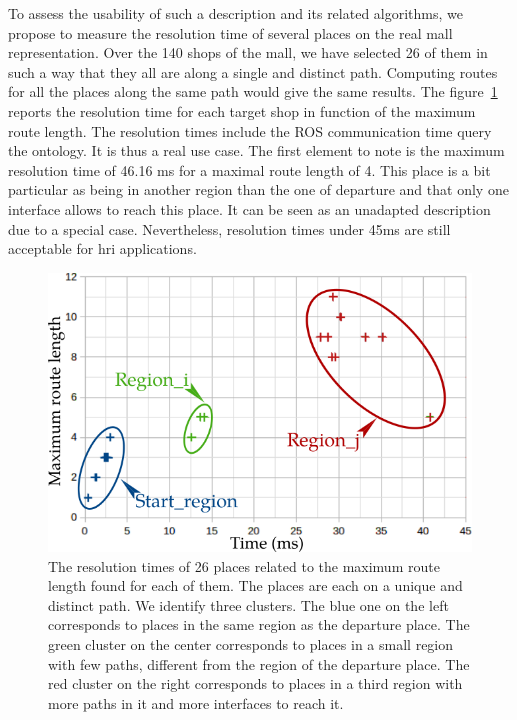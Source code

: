To assess the usability of such a description and its related algorithms, we propose to measure the resolution time of several places on the real mall representation. Over the 140 shops of the mall, we have selected 26 of them in such a way that they all are along a single and distinct path. Computing routes for all the places along the same path would give the same results. The figure~\ref{fig:chap3_performance} reports the resolution time for each target shop in function of the maximum route length. The resolution times include the ROS communication time query the ontology. It is thus a real use case. The first element to note is the maximum resolution time of 46.16 ms for a maximal route length of 4. This place is a bit particular as being in another region than the one of departure and that only one interface allows to reach this place. It can be seen as an unadapted description due to a special case. Nevertheless, resolution times under 45ms are still acceptable for \acrshort{hri} applications.

\begin{figure}[ht!]
\centering
\includegraphics[scale=0.6]{figures/chapter3/performance.png}
\caption{\label{fig:chap3_performance} The resolution times of 26 places related to the maximum route length found for each of them. The places are each on a unique and distinct path. We identify three clusters. The blue one on the left corresponds to places in the same region as the departure place. The green cluster on the center corresponds to places in a small region with few paths, different from the region of the departure place. The red cluster on the right corresponds to places in a third region with more paths in it and more interfaces to reach it. }
\end{figure}

